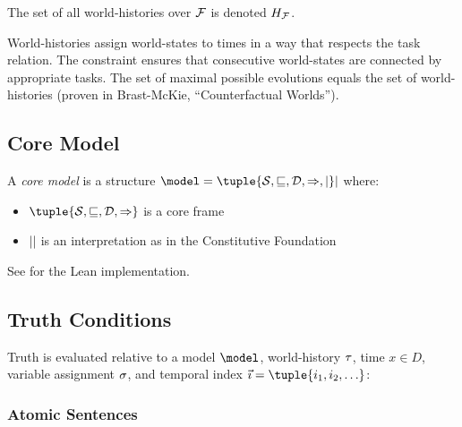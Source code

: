 \documentclass[../LogosReference.tex]{subfiles}
\begin{document}
\begin{notation}
	The set of all world-histories over $\mathcal{F}$ is denoted $H_\mathcal{F}$.
\end{notation}

\begin{remark}
	World-histories assign world-states to times in a way that respects the task relation.
	The constraint ensures that consecutive world-states are connected by appropriate tasks.
	The set of maximal possible evolutions equals the set of world-histories (proven in Brast-McKie, ``Counterfactual Worlds'').
\end{remark}


\subsection{Core Model}\label{sec:core-model}

\begin{definition}\label{def:core-model}
	A \emph{core model} is a structure $\model = \tuple{\statespace, \parthood, \temporalorder, \taskrel, \interp}$ where:
	\begin{itemize}
		\item $\tuple{\statespace, \parthood, \temporalorder, \taskrel}$ is a core frame
		\item $\interp$ is an interpretation as in the Constitutive Foundation
	\end{itemize}
\end{definition}

See  for the Lean implementation.


\subsection{Truth Conditions}\label{sec:truth-conditions}

Truth is evaluated relative to a model $\model$, world-history $\tau$, time $x \in D$, variable assignment $\sigma$, and temporal index $\tempindex = \tuple{i_1, i_2, \ldots}$:

\subsubsection{Atomic Sentences}
\end{document}
